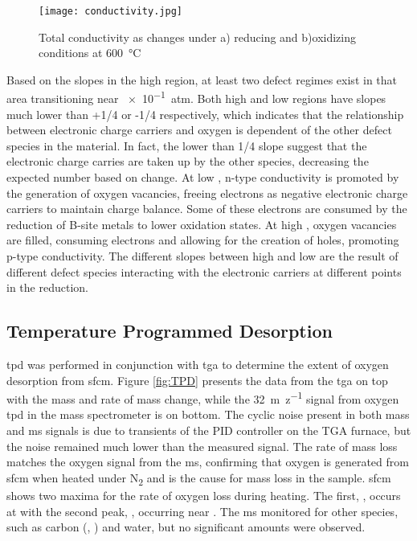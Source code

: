     \begin{figure}[p]
      \texttt{[image: conductivity.jpg]}
      \caption{Total conductivity as  changes under a) reducing and b)oxidizing conditions at \SI{600}{\celsius}}
      \label{fig:conductivity}
    \end{figure}

    Based on the slopes in the high  region, at least two defect regimes exist in that area transitioning near \SI{e-1}{atm}.
    Both high and low  regions have slopes much lower than +1/4 or -1/4 respectively, which indicates that the relationship between electronic charge carriers and oxygen is dependent of the other defect species in the material.
    In fact, the lower than 1/4 slope suggest that the electronic charge carries are taken up by the other species, decreasing the expected number based on  change.
    At low , n-type conductivity is promoted by the generation of oxygen vacancies, freeing electrons as negative electronic charge carriers to maintain charge balance.
    Some of these electrons are consumed by the reduction of B-site metals to lower oxidation states.
    At high , oxygen vacancies are filled, consuming electrons and allowing for the creation of holes, promoting p-type conductivity.
    The different slopes between high and low  are the result of different defect species interacting with the electronic carriers at different points in the reduction.

    \subsection{Temperature Programmed Desorption}
    \Gls{tpd} was performed in conjunction with \gls{tga} to determine the extent of oxygen desorption from \gls{sfcm}.
    Figure \ref{fig:TPD} presents the data from the \gls{tga} on top with the mass and rate of mass change, while the \SI{32}{m\per z} signal from oxygen \gls{tpd} in the mass spectrometer is on bottom.
    The cyclic noise present in both mass and \gls{ms} signals is due to transients of the PID controller on the TGA furnace, but the noise remained much lower than the measured signal.
    The rate of mass loss matches the oxygen signal from the \gls{ms}, confirming that oxygen is generated from \gls{sfcm} when heated under N\textsubscript{2} and is the cause for mass loss in the sample.
    \gls{sfcm} shows two maxima for the rate of oxygen loss during heating.
    The first, \textalpha, occurs at  with the second peak, \textbeta, occurring near .
    The \gls{ms} monitored for other species, such as carbon (, ) and water, but no significant amounts were observed.

